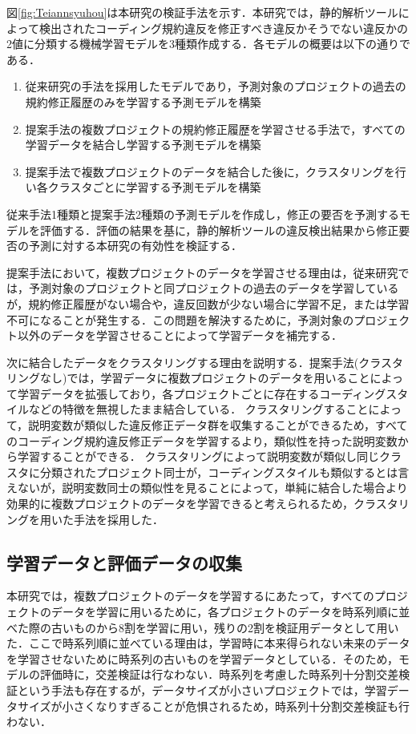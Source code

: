 \documentclass[submit,noauthor,dvipdfmx]{ipsj}
\begin{document}
図\ref{fig:Teiannsyuhou}は本研究の検証手法を示す．本研究では，静的解析ツールによって検出されたコーディング規約違反を修正すべき違反かそうでない違反かの2値に分類する機械学習モデルを3種類作成する．各モデルの概要は以下の通りである．

\begin{enumerate}
  \item 従来研究の手法を採用したモデルであり，予測対象のプロジェクトの過去の規約修正履歴のみを学習する予測モデルを構築
  \item 提案手法の複数プロジェクトの規約修正履歴を学習させる手法で，すべての学習データを結合し学習する予測モデルを構築
  \item 提案手法で複数プロジェクトのデータを結合した後に，クラスタリングを行い各クラスタごとに学習する予測モデルを構築
\end{enumerate}

従来手法1種類と提案手法2種類の予測モデルを作成し，修正の要否を予測するモデルを評価する．評価の結果を基に，静的解析ツールの違反検出結果から修正要否の予測に対する本研究の有効性を検証する．

提案手法において，複数プロジェクトのデータを学習させる理由は，従来研究では，予測対象のプロジェクトと同プロジェクトの過去のデータを学習しているが，規約修正履歴がない場合や，違反回数が少ない場合に学習不足，または学習不可になることが発生する．この問題を解決するために，予測対象のプロジェクト以外のデータを学習させることによって学習データを補完する．

次に結合したデータをクラスタリングする理由を説明する．提案手法(クラスタリングなし)では，学習データに複数プロジェクトのデータを用いることによって学習データを拡張しており，各プロジェクトごとに存在するコーディングスタイルなどの特徴を無視したまま結合している．
クラスタリングすることによって，説明変数が類似した違反修正データ群を収集することができるため，すべてのコーディング規約違反修正データを学習するより，類似性を持った説明変数から学習することができる．
クラスタリングによって説明変数が類似し同じクラスタに分類されたプロジェクト同士が，コーディングスタイルも類似するとは言えないが，説明変数同士の類似性を見ることによって，単純に結合した場合より効果的に複数プロジェクトのデータを学習できると考えられるため，クラスタリングを用いた手法を採用した．



\subsection{学習データと評価データの収集}

本研究では，複数プロジェクトのデータを学習するにあたって，すべてのプロジェクトのデータを学習に用いるために，各プロジェクトのデータを時系列順に並べた際の古いものから8割を学習に用い，残りの2割を検証用データとして用いた．ここで時系列順に並べている理由は，学習時に本来得られない未来のデータを学習させないために時系列の古いものを学習データとしている．そのため，モデルの評価時に，交差検証は行なわない．時系列を考慮した時系列十分割交差検証という手法も存在するが，データサイズが小さいプロジェクトでは，学習データサイズが小さくなりすぎることが危惧されるため，時系列十分割交差検証も行わない．
\end{document}
